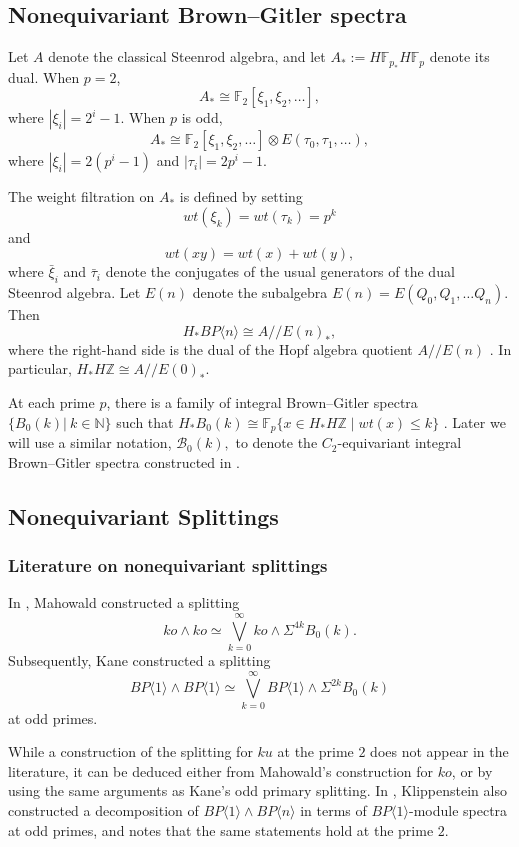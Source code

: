 \documentclass{amsart}
\theoremstyle{plain}
\numberwithin{equation}{section}
\numberwithin{figure}{section}
\newcommand{\mF}{{\mathbb F}}
\newcommand{\mZ}{{\mathbb Z}}
\newcommand{\0}{\langle 0 \rangle }
\newcommand{\one}{\langle 1 \rangle }
\begin{document}
\subsection{Nonequivariant Brown--Gitler spectra}
Let $A$ denote the classical Steenrod algebra, and let $A_{*} := H\mF_{p_{*}}H\mF_{p}$ denote its dual. When $p=2$, 
\[A_{*} \cong \mF_{2}[\xi_{1}, \xi_{2},\ldots ],
\]
where $| \xi_i | = 2^i - 1$. When $p$ is odd, 
\[A_{*} \cong \mF_{2}[\xi_{1}, \xi_{2},\ldots ] \otimes E(\tau_{0}, \tau_{1}, \ldots),
\]
where $|\xi_i| = 2(p^i -1)$ and $| \tau_i | = 2 p^i - 1$. 

The weight filtration on $A_{*}$ is defined by setting 
\[
wt({\xi}_{k}) = wt({\tau}_{k}) = p^{k}
\]
and 
\[
wt(xy) = wt(x) + wt(y),
\]
where $\bar{\xi}_i$ and $\bar{\tau}_i$ denote the conjugates of the usual generators of the dual Steenrod algebra.
Let $E(n)$ denote the subalgebra $E(n) = E(Q_{0}, Q_{1}, \ldots Q_{n})$. Then
\[H_{*}BP\langle n \rangle \cong A//E(n)_{*},\]
where the right-hand side is the dual of the Hopf algebra quotient $A//E(n)$ \cite[Prop~1.7]{wilson1975omega}. 
In particular, $H_{*}H\mZ \cong A//E(0)_{*}$. 

At each prime $p$, there is a family of integral Brown--Gitler spectra $\{B_{0}(k)|\ k \in \mathbb{N} \}$ such that $H_{*}B_{0}(k) \cong \mF_{p}\{x \in H_{*}H\mathbb{Z} \mid  wt(x) \le k\}$ \cite{goerss1986some}. Later we will use a similar notation, $\mathcal{B}_{0}(k),$ to denote the $C_2$-equivariant integral Brown--Gitler spectra constructed in \cite{LiPetersenTatum23}.

\subsection{Nonequivariant Splittings}
\subsubsection{Literature on nonequivariant splittings}
In \cite{mahowald1981bo}, Mahowald constructed a splitting \[ko \wedge ko \simeq \overset{\infty}{\underset{k=0}{\bigvee}} ko \wedge \Sigma^{4k} B_{0}(k).\]
Subsequently, Kane \cite{kane1981operations} constructed a splitting 
\[ 
BP\one \wedge BP\one \simeq \overset{\infty}{\underset{k=0}{\bigvee}}BP\one \wedge \Sigma^{2k} B_{0}(k) 
\] 
at odd primes.

While a construction of the splitting for $ku$ at the prime $2$ does not appear in the literature, it can be deduced either from Mahowald's construction for $ko$, or by using the same arguments as Kane's odd primary splitting. In \cite{klippenstein_splitting}, Klippenstein also constructed a decomposition of $BP\one \wedge BP\langle n \rangle$ in terms of $BP\one$-module spectra at odd primes, and notes that the same statements hold at the prime $2$.
\end{document}
